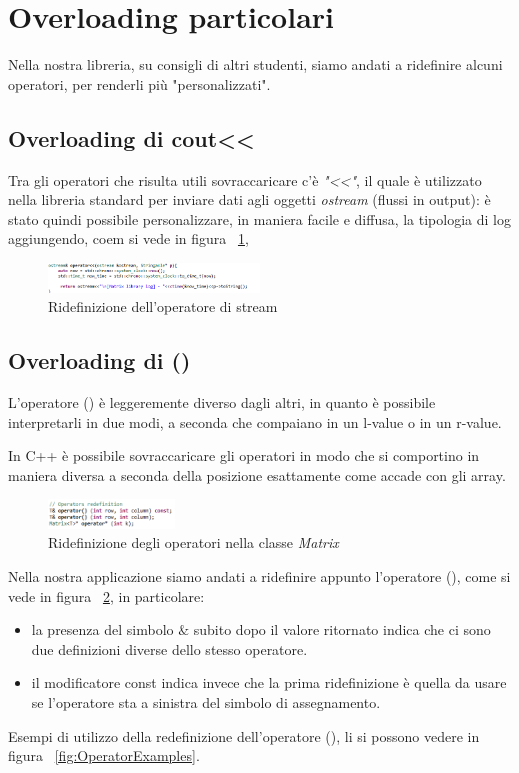 \section{Overloading particolari}
Nella nostra libreria, su consigli di altri studenti, siamo andati a ridefinire alcuni operatori, per renderli più "personalizzati".
\subsection{Overloading di cout<<}
Tra gli operatori che risulta utili sovraccaricare c'è \textit{"<<"}, il quale è utilizzato nella libreria standard per inviare dati agli oggetti \textit{ostream} (flussi in output): è stato quindi possibile personalizzare, in maniera facile e diffusa, la tipologia di log aggiungendo, coem si vede in figura ~\ref{fig:CoutRedef}, 

\begin{figure}[h]
	\centering
	\includegraphics[width=0.5\textwidth]{Immagini/CoutRedefinition.png}
	\caption{Ridefinizione dell'operatore di stream}
	\label{fig:CoutRedef}
\end{figure}

\subsection{Overloading di ()}
L'operatore () è leggeremente diverso dagli altri, in quanto è possibile interpretarli in due modi, a seconda che compaiano in un l-value o in un r-value.

In C++ è possibile sovraccaricare gli operatori in modo che si comportino in maniera diversa a seconda della posizione esattamente come accade con gli array.

\begin{figure}[h]
	\centering
	\includegraphics[width=0.3\textwidth]{Immagini/MatrixOperatorsRedef.png}
	\caption{Ridefinizione degli operatori nella classe \textit{Matrix}}
	\label{fig:MatrixOperatorRedef}
\end{figure}

Nella nostra applicazione siamo andati a ridefinire appunto l'operatore (), come si vede in figura ~\ref{fig:MatrixOperatorRedef}, in particolare:
\begin{itemize}
	\item  la presenza del simbolo $\&$ subito dopo il valore ritornato indica che ci sono due definizioni diverse dello stesso operatore.
	\item il modificatore const indica invece che la prima ridefinizione è quella da usare se l'operatore sta a sinistra del simbolo di assegnamento.
\end{itemize}
Esempi di utilizzo della redefinizione dell'operatore (), li si possono vedere in figura ~\ref{fig:OperatorExamples}.


